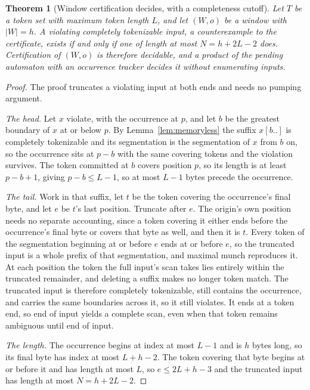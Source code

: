 \documentclass[11pt,a4paper]{article}
\theoremstyle{definition}
\theoremstyle{plain}
\newtheorem{theorem}{Theorem}
\begin{document}
\begin{theorem}[Window certification decides, with a completeness cutoff]\label{thm:cutoff}
Let $T$ be a token set with maximum token length $L$, and let $(W, o)$ be a window with $|W| = h$. A violating
completely tokenizable input, a counterexample to the certificate, exists if and only if one of length at most
$N = h + 2L - 2$ does. Certification of $(W, o)$ is therefore decidable, and a product of the pending automaton with an
occurrence tracker decides it without enumerating inputs.
\end{theorem}

\begin{proof}
The proof truncates a violating input at both ends and needs no pumping argument.

\emph{The head.} Let $x$ violate, with the occurrence at $p$, and let $b$ be the greatest boundary of $x$ at or below
$p$. By Lemma~\ref{lem:memoryless} the suffix $x[b..]$ is completely tokenizable and its segmentation is the
segmentation of $x$ from $b$ on, so the occurrence sits at $p - b$ with the same covering tokens and the violation
survives. The token committed at $b$ covers position $p$, so its length is at least $p - b + 1$, giving
$p - b \le L - 1$, so at most $L - 1$ bytes precede the occurrence.

\emph{The tail.} Work in that suffix, let $t$ be the token covering the occurrence's final byte, and let $e$ be $t$'s
last position. Truncate after $e$. The origin's own position needs no separate accounting, since a token covering it
either ends before the occurrence's final byte or covers that byte as well, and then it is $t$. Every token of the
segmentation beginning at or before $e$ ends at or before $e$, so the truncated input is a whole prefix of that
segmentation, and maximal munch reproduces it. At each position the token the full input's scan takes lies entirely
within the truncated remainder, and deleting a suffix makes no longer token match. The truncated input is therefore
completely tokenizable, still contains the occurrence, and carries the same boundaries across it, so it still violates.
It ends at a token end, so end of input yields a complete scan, even when that token remains ambiguous until end of
input.

\emph{The length.} The occurrence begins at index at most $L - 1$ and is $h$ bytes long, so its final byte has index at
most $L + h - 2$. The token covering that byte begins at or before it and has length at most $L$, so $e \le 2L + h - 3$
and the truncated input has length at most $N = h + 2L - 2$.


\end{proof}
\end{document}
